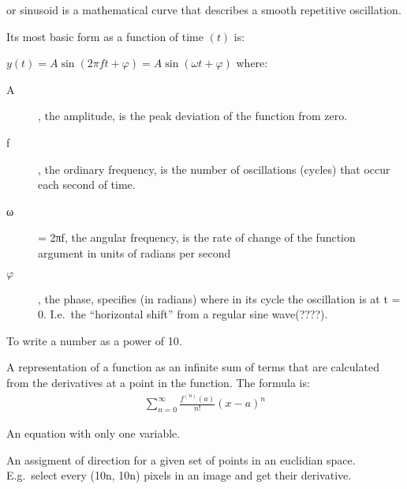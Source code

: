 \begin{definition}
or sinusoid is a mathematical curve that describes a smooth repetitive
oscillation.

Its most basic form as a function of time $(t)$ is:

$y(t) = A\sin(2 \pi f t + \varphi) = A\sin(\omega t + \varphi)$
where:
\begin{description}
    \item[A], the amplitude, is the peak deviation of the function from zero.
    \item[f], the ordinary frequency, is the number of oscillations (cycles)
        that occur each second of time.
    \item[ω] = 2πf, the angular frequency, is the rate of change of the
    function argument in units of radians per second 
    \item[$\varphi$], the phase, specifies (in radians) where in its cycle the
        oscillation is at t = 0. I.e.\ the ``horizontal shift'' from a regular
        sine wave(????).
\end{description}

\end{definition}

\begin{definition}
    To write a number as a power of 10.
\end{definition}

\begin{definition}
    A representation of a function as an infinite sum of terms that are 
    calculated from the derivatives at a point in the function.
    The formula is:
    \begin{align}
        \sum\limits_{n=0}^{\infty}{\frac{f^{(n)}(a)}{n!}{(x-a)}^{n}}
    \end{align}
\end{definition}

\begin{definition}[Univariate]
    An equation with only one variable.
\end{definition}

\begin{definition}\label{vectorfield}
    An assigment of direction for a given set of points in an euclidian space.
    E.g.\ select every (10n, 10n) pixels in an image and get their derivative.
\end{definition}
